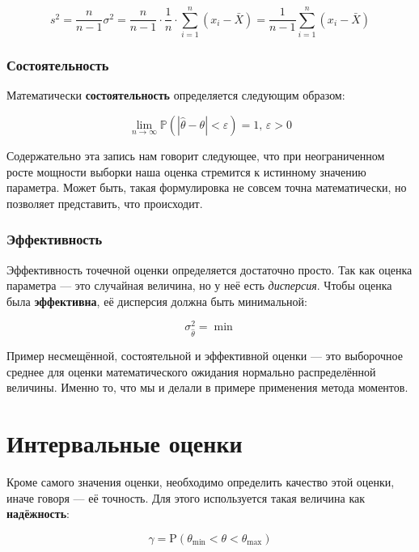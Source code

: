 \documentclass[
  letterpaper,
  DIV=11,
  numbers=noendperiod]{scrreprt}
\theoremstyle{definition}
\theoremstyle{remark}
\begin{document}
\[
s^2 = \frac{n}{n-1} \sigma^2 = \frac{n}{n-1} \cdot \frac{1}{n} \cdot \sum_{i=1}^n (x_i - \bar X) = \frac{1}{n-1} \sum_{i=1}^n (x_i - \bar X)
\]

\subsubsection{Состоятельность}\label{ux441ux43eux441ux442ux43eux44fux442ux435ux43bux44cux43dux43eux441ux442ux44c}

Математически \textbf{состоятельность} определяется следующим образом:

\[
\lim_{n \rightarrow \infty} \mathbb{P}(|\hat \theta - \theta| < \varepsilon) = 1, \, \varepsilon > 0
\]

Содержательно эта запись нам говорит следующее, что при неограниченном
росте мощности выборки наша оценка стремится к истинному значению
параметра. Может быть, такая формулировка не совсем точна математически,
но позволяет представить, что происходит.

\subsubsection{Эффективность}\label{ux44dux444ux444ux435ux43aux442ux438ux432ux43dux43eux441ux442ux44c}

Эффективность точечной оценки определяется достаточно просто. Так как
оценка параметра --- это случайная величина, но у неё есть
\emph{дисперсия}. Чтобы оценка была \textbf{эффективна}, её дисперсия
должна быть минимальной:

\[
\sigma^2_{\hat \theta} = \min
\]

Пример несмещённой, состоятельной и эффективной оценки --- это
выборочное среднее для оценки математического ожидания нормально
распределённой величины. Именно то, что мы и делали в примере применения
метода моментов.

\section{Интервальные
оценки}\label{ux438ux43dux442ux435ux440ux432ux430ux43bux44cux43dux44bux435-ux43eux446ux435ux43dux43aux438}

Кроме самого значения оценки, необходимо определить качество этой
оценки, иначе говоря --- её точность. Для этого используется такая
величина как \textbf{надёжность}:

\[
\gamma = \mathrm{P}(\theta_\min < \theta < \theta_\max)
\]
\end{document}
